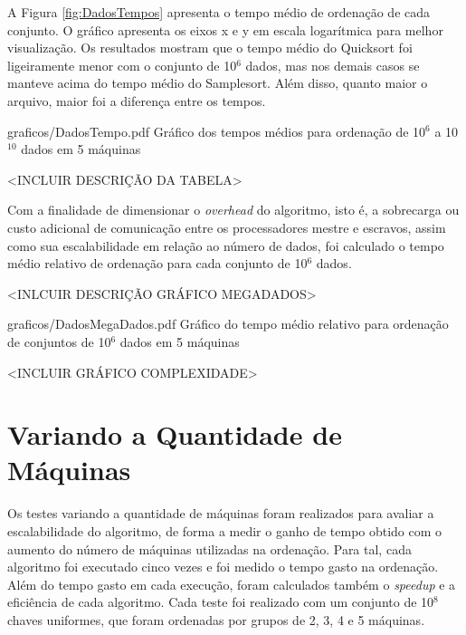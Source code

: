 A Figura \ref{fig:DadosTempos} apresenta o tempo médio de ordenação de cada conjunto. O gráfico
apresenta os eixos x e y em escala logarítmica para melhor visualização. Os resultados mostram que
o tempo médio do Quicksort foi ligeiramente menor com o conjunto de 10$^6$ dados, mas nos demais
casos se manteve acima do tempo médio do Samplesort. Além disso, quanto maior o
arquivo, maior foi a diferença entre os tempos. 

\begin{defaultFigure}{0.75\textwidth}{graficos/DadosTempo.pdf}
{Gráfico dos tempos médios para ordenação de 10$^6$ a 10$^{10}$ dados em 5 máquinas}
\label{fig:DadosTempos}
\end{defaultFigure}
 

<INCLUIR DESCRIÇÃO DA TABELA>



Com a finalidade de dimensionar o \textit{overhead} do algoritmo, isto é, a sobrecarga ou custo
adicional de comunicação entre os processadores mestre e escravos, assim como sua escalabilidade em
relação ao número de dados, foi calculado o tempo médio relativo de ordenação para cada conjunto de
10$^6$ dados. 
 
<INLCUIR DESCRIÇÃO GRÁFICO MEGADADOS>
 
\begin{defaultFigure}{0.75\textwidth}{graficos/DadosMegaDados.pdf}
{Gráfico do tempo médio relativo para ordenação de conjuntos de 10$^6$ dados em 5 máquinas}
\label{fig:DadosMegaDados}
\end{defaultFigure}
 
 
% 
<INCLUIR GRÁFICO COMPLEXIDADE>
% 


\newpage
\section{Variando a Quantidade de Máquinas}

Os testes variando a quantidade de máquinas foram realizados para avaliar a escalabilidade do
algoritmo, de forma a medir o ganho de tempo obtido com o aumento do número de máquinas
utilizadas na ordenação. Para tal, cada algoritmo foi executado cinco vezes e foi medido o tempo
gasto na ordenação. 
Além do tempo gasto em cada execução, foram calculados também o \textit{speedup}
e a eficiência de cada algoritmo. Cada teste foi realizado com um conjunto de 10$^8$
chaves uniformes, que foram ordenadas por grupos de 2, 3, 4 e 5 máquinas.

